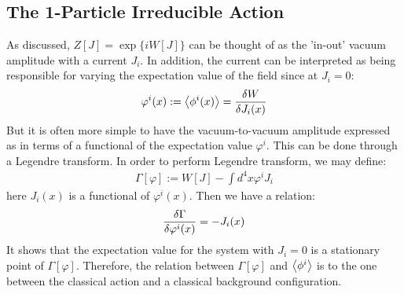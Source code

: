 \subsection{The 1-Particle Irreducible Action}
As discussed, $Z[J] = \exp \lbrace iW[J] \rbrace$ can be thought of as the 'in-out' vacuum amplitude with a current $J_{i}$. In addition, the current can be interpreted as being responsible for varying the expectation value of the field since at $J_{i}  = 0$:
\begin{align}
    \varphi^{i} (x) := \expval{\phi^{i}(x)} = \fdv{W}{J_{i} (x)}
\end{align}
But it is often more simple to have the vacuum-to-vacuum amplitude expressed as in terms of a functional of the expectation value $\varphi ^{i}$. This can be done through a Legendre transform. In order to perform Legendre transform, we may define:
\begin{align}
    \Gamma [\varphi] := W[J] - \int d^{4}x \varphi ^{i}J_{i}
\end{align}
here $J_{i}(x)$ is a functional of $\varphi ^{i}(x)$. Then we have a relation:
\begin{align}
    \fdv{\Gamma}{\varphi^{i}(x)} = -J_{i}(x)
\end{align}
It shows that the expectation value for the system with $J_{i}=0$ is a stationary point of $\Gamma[\varphi]$. Therefore, the relation between $\Gamma[\varphi]$ and $\expval{\phi^{i}}$ is to the one between the classical action and a classical background configuration. 
